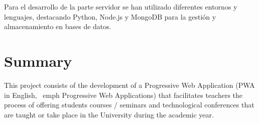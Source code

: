 \documentclass[a4paper, 12pt]{book}
\begin{document}
%
	

	Para el desarrollo de la parte servidor se han utilizado diferentes entornos y lenguajes, destacando Python, Node.js y MongoDB para la gestión y almacenamiento en bases de datos.
	


\chapter*{Summary}

	This project consists of the development of a Progressive Web Application (PWA in English, \ emph {Progressive Web Applications}) that facilitates teachers the process of offering students courses / seminars and technological conferences that are taught or take place in the University during the academic year.
\end{document}
